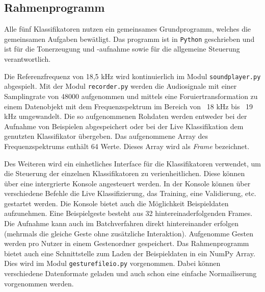 \subsection{Rahmenprogramm}
\label{sec:app}
Alle fünf Klassifikatoren nutzen ein gemeinsames Grundprogramm, welches die
gemeinsamen Aufgaben bewätligt. Das programm ist in \texttt{Python} geschrieben
und ist für die Tonerzeugung und -aufnahme sowie für die allgemeine Steuerung
verantwortlich. 

Die Referenzfrequenz von 18,5 kHz wird kontinuierlich im Modul
\texttt{soundplayer.py} abgespielt. Mit der Modul \texttt{recorder.py} werden
die Audiosignale mit einer Samplingrate von 48000 aufgenommen und mittels eine
Foruiertransformation zu einem Datenobjekt mit dem Frequenzspektrum im Bereich
von ~18 kHz bis ~19 kHz umgewandelt. Die so aufgenommenen Rohdaten werden
entweder bei der Aufnahme von Beispielen abgespeichert oder bei der Live
Klassifikation dem genutzten Klassifikator übergeben. Das aufgenommene Array des
Frequenzspektrums enthält 64 Werte. Dieses Array wird als \textit{Frame}
bezeichnet.

Des Weiteren wird ein einhetliches Interface für die Klassifikatoren verwendet,
um die Steuerung der einzelnen Klassifikatoren zu verienheitlichen. Diese können
über eine intergrierte Konsole angesteuert werden. In der Konsole können über
verschiedene Befehle die Live Klassifizierung, das Training, eine Validierung,
etc. gestartet werden.  
\enlargethispage{\baselineskip}
Die Konsole bietet auch die Möglichkeit Beispieldaten aufzunehmen. Eine
Beispielgeste besteht aus 32 hintereinaderfolgenden Frames. Die Aufnahme kann
auch im Batchverfahren direkt hintereinander erfolgen (mehrmals die gleiche
Geste ohne zusätzliche Interaktion). Aufgenomme Gesten werden pro Nutzer in
einem Gestenordner gespeichert. Das Rahmenprogramm bietet auch eine
Schnittstelle zum Laden der Beispieldaten in ein NumPy Array. Dies wird im Modul
\texttt{gesturefileio.py} vorgenommen. Dabei können verschiedene Datenformate
geladen und auch schon eine einfache Normailiserung vorgenommen werden.


